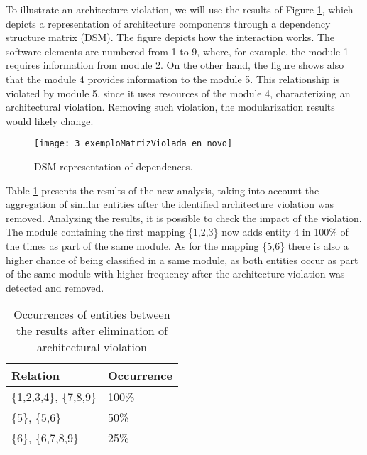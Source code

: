 To illustrate an architecture violation, we will use the results of Figure \ref{3_exemploMatrizViolada}, which depicts a representation of architecture components through a dependency structure matrix (DSM). The figure depicts how the interaction works. The software elements are numbered from 1 to 9, where, for example, the module 1 requires information from module 2. On the other hand, the figure shows also that the module 4 provides information to the module 5. This relationship is violated by module 5, since it uses resources of the module 4, characterizing an architectural violation. Removing such violation, the modularization results would likely change. 

 \begin{figure}[!h]
 	\centering
 	\texttt{[image: 3\_exemploMatrizViolada\_en\_novo]}
 	\caption{DSM representation	of dependences.}
 	\label{3_exemploMatrizViolada}
 \end{figure}
 
 Table \ref{ocorrencias_2} presents the results of the new analysis, taking into account the aggregation of similar entities after the identified architecture violation was removed. Analyzing the results, it is possible to check the impact of the violation. The module containing the first mapping \{1,2,3\} now adds entity 4 in 100\% of the times as part of the same module. As for the mapping \{5,6\} there is also a higher chance of being classified in a same module, as both entities occur as part of the same module with higher frequency after the architecture violation was detected and removed.


\begin{table}[]
	\centering
	\caption{Occurrences of entities between the results after elimination of architectural violation}
	\label{ocorrencias_2}
	\begin{tabular}{|ll|}
		\hline
		\multicolumn{1}{|l}{Relation} & \multicolumn{1}{l|}{Occurrence} \\ \hline
		\{1,2,3,4\}, \{7,8,9\}  	 & 100\%                           \\ \hline
		\{5\}, \{5,6\}	& 50\%                            \\ \hline
		\{6\}, \{6,7,8,9\}	& 25\%                            \\ 
		\hline
	\end{tabular}
\end{table}


